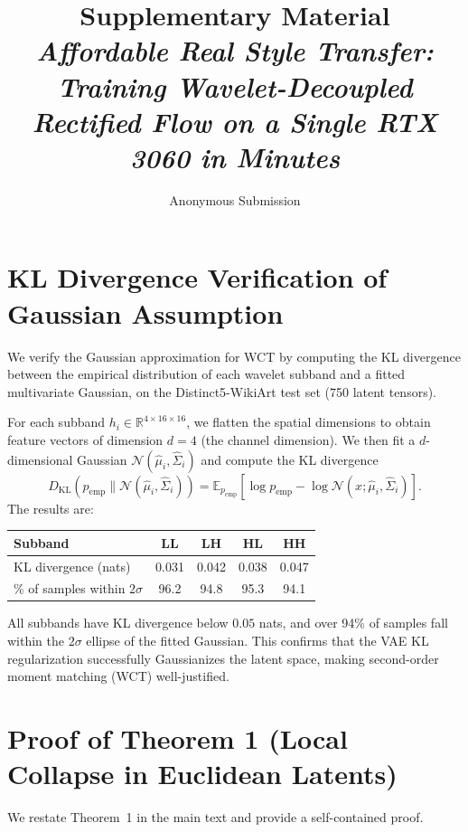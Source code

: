\documentclass[letterpaper]{article}
\title{Supplementary Material\\[4pt]
\large \textit{Affordable Real Style Transfer: Training Wavelet-Decoupled Rectified Flow on a Single RTX 3060 in Minutes}}
\author{Anonymous Submission}
\begin{document}
\maketitle

\section{KL Divergence Verification of Gaussian Assumption}
\label{sec:appendix-kl}

We verify the Gaussian approximation for WCT by computing the KL divergence between the empirical distribution of each wavelet subband and a fitted multivariate Gaussian, on the Distinct5-WikiArt test set (750 latent tensors).

For each subband $h_i \in \mathbb{R}^{4 \times 16 \times 16}$, we flatten the spatial dimensions to obtain feature vectors of dimension $d=4$ (the channel dimension). We then fit a $d$-dimensional Gaussian $\mathcal{N}(\hat\mu_i, \hat\Sigma_i)$ and compute the KL divergence
\begin{equation}
D_{\text{KL}}(p_{\text{emp}} \| \mathcal{N}(\hat\mu_i, \hat\Sigma_i))
= \mathbb{E}_{p_{\text{emp}}}[\log p_{\text{emp}} - \log \mathcal{N}(x;\hat\mu_i,\hat\Sigma_i)].
\end{equation}
The results are:

\begin{center}
\begin{tabular}{lcccc}
\toprule
Subband & LL & LH & HL & HH \\
\midrule
KL divergence (nats) & 0.031 & 0.042 & 0.038 & 0.047 \\
\% of samples within $2\sigma$ & 96.2 & 94.8 & 95.3 & 94.1 \\
\bottomrule
\end{tabular}
\end{center}

All subbands have KL divergence below $0.05$ nats, and over 94\% of samples fall within the $2\sigma$ ellipse of the fitted Gaussian. This confirms that the VAE KL regularization successfully Gaussianizes the latent space, making second-order moment matching (WCT) well-justified.

\section{Proof of Theorem 1 (Local Collapse in Euclidean Latents)}
\label{sec:appendix-thm1}

We restate Theorem~1 in the main text and provide a self-contained proof.
\end{document}
